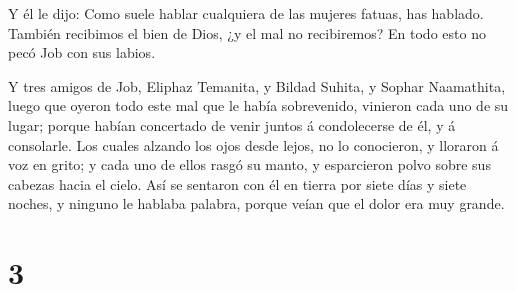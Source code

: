  Y él le dijo: Como suele hablar cualquiera de las mujeres
fatuas, has hablado. También recibimos el bien de Dios, ¿y el mal no
recibiremos? En todo esto no pecó Job con sus labios.

 Y tres amigos de Job, Eliphaz Temanita, y Bildad Suhita, y
Sophar Naamathita, luego que oyeron todo este mal que le había
sobrevenido, vinieron cada uno de su lugar; porque habían concertado de
venir juntos á condolecerse de él, y á consolarle.  Los
cuales alzando los ojos desde lejos, no lo conocieron, y lloraron á voz
en grito; y cada uno de ellos rasgó su manto, y esparcieron polvo sobre
sus cabezas hacia el cielo.  Así se sentaron con él en
tierra por siete días y siete noches, y ninguno le hablaba palabra,
porque veían que el dolor era muy grande.

\hypertarget{section-2}{%
\section{3}\label{section-2}}

